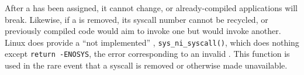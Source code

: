 After a  has been assigned, it cannot change, or already-compiled applications will break.
Likewise, if a  is removed, its syscall number cannot be recycled, or previously compiled code would aim to invoke one  but would invoke another.
Linux does provide a ``not implemented'' , \texttt{sys_ni_syscall()}, which does nothing except \texttt{return -ENOSYS}, the error corresponding to an invalid .
This function is used in the rare event that a syscall is removed or otherwise made unavailable.


